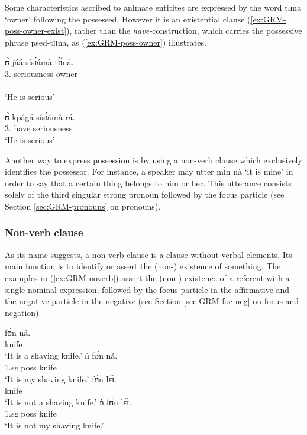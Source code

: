 \z 
 \z

Some characteristics ascribed to animate entitites are expressed by  the
word {\sls tɪɪna} `owner' following the possessed.  However it
is an existential clause (\ref{ex:GRM-poss-owner-exist}), rather than the  {\it
have-}construction, which carries the
possessive phrase {\sc psed}{\sls -tɪɪna}, as (\ref{ex:GRM-poss-owner})
illustrates.



\ea\label{ex:GRM-poss-owner}

 \ea\label{ex:GRM-poss-owner-exist}
\glll ʊ̀ jáá sísɪ́ámà-tɪ́ɪ́ná.\\
{3.\sg} {\ident} seriousness-owner\\
  {\psor} {}   {\psed}\\
\glt `He is serious'

 \ex\label{ex:GRM-poss-owner-have}
\gll ʊ̀ kpágá sísɪ́ámà rá.\\
{3.\sg} have {seriousness} {\foc}\\
\glt `He is serious'

\z 
 \z

Another way to express possession is by using a non-verb clause which
  exclusively identifies   the possessor. For instance, a speaker may utter 
{\sls 
mɪ́n nà} `it is
mine' in order to say that a
certain thing belongs to him or her. This utterance consists solely of the third
singular strong pronoun followed by
the focus particle (see Section \ref{sec:GRM-pronouns} on pronouns).


\subsubsection{Non-verb clause}
\label{sec:GRM-noverb}

As its name suggests, a non-verb clause is a clause without verbal elements. 
Its
main function is to identify or assert the (non-) existence of 
something.  The examples in (\ref{ex:GRM-noverb}) assert the (non-) existence
of a
referent with a single nominal expression, followed by the focus particle in
the affirmative and the negative particle in the negative (see Section
\ref{sec:GRM-foc-neg} on focus and negation). 


\begin{multicols}{2}
\ea\label{ex:GRM-noverb}
 \ea\label{ex:GRM-noverb-aff-1}
\gll fʊ́n ná.\\
knife {\foc}\\
\glt `It is a shaving knife.'
 \ex\label{ex:GRM-noverb-aff-poss}
\gll ǹ̩ fʊ́n ná.\\
{\sc 1.sg.poss} knife {\foc}\\
 \glt `It is my shaving knife.'
 \ex\label{ex:GRM-noverb-neg-1}
\gll fʊ́n lɛ̀ɪ́.\\
knife {\neg}\\
 \glt `It is not a shaving knife.'
 \ex\label{ex:GRM-noverb-neg-poss}
\gll ǹ̩  fʊ́n lɛ̀ɪ́.\\
{\sc 1.sg.poss} knife {\neg}\\
 \glt `It is not my shaving knife.'

\z 
 \z
\end{multicols}

